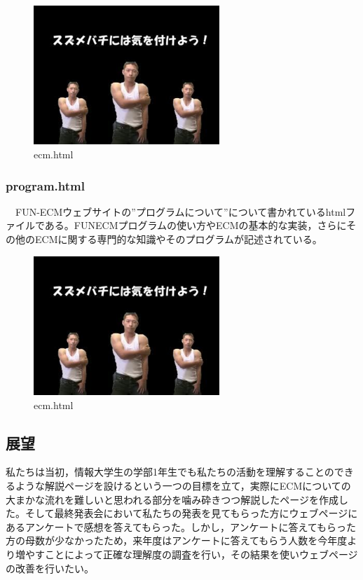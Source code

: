 \documentclass[openany,11pt,papersize]{jsbook}
\begin{document}
\begin{figure}[H]
  \begin{center} %
    \includegraphics[clip, width=7.0cm]{./figure/smile.png}
    \caption{ecm.html} %
    \label{ecm} %
  \end{center}
\end{figure}

\subsubsection{program.html}
　FUN-ECMウェブサイトの”プログラムについて”について書かれているhtmlファイルである。FUNECMプログラムの使い方やECMの基本的な実装，さらにその他のECMに関する専門的な知識やそのプログラムが記述されている。

\begin{figure}[H]
  \begin{center} %
    \includegraphics[clip, width=7.0cm]{./figure/smile.png}
    \caption{ecm.html} %
    \label{ecm} %
  \end{center}
\end{figure}


\subsection{展望}
私たちは当初，情報大学生の学部1年生でも私たちの活動を理解することのできるような解説ページを設けるという一つの目標を立て，実際にECMについての大まかな流れを難しいと思われる部分を噛み砕きつつ解説したページを作成した。そして最終発表会において私たちの発表を見てもらった方にウェブページにあるアンケートで感想を答えてもらった。しかし，アンケートに答えてもらった方の母数が少なかったため，来年度はアンケートに答えてもらう人数を今年度より増やすことによって正確な理解度の調査を行い，その結果を使いウェブページの改善を行いたい。
\end{document}
